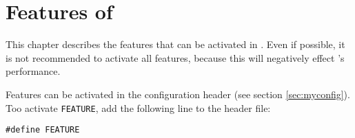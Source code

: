 \chapter{Features of \es}
\label{chap:features}

\newcommand{\feature}[1]{\texttt{\textbf{#1}}}

This chapter describes the features that can be activated in \es. Even
if possible, it is not recommended to activate all features, because
this will negatively effect \es's performance.

Features can be activated in the configuration header (see section
\vref{sec:myconfig}). Too activate \texttt{FEATURE}, add the following
line to the header file:
\begin{verbatim}
#define FEATURE
\end{verbatim}

